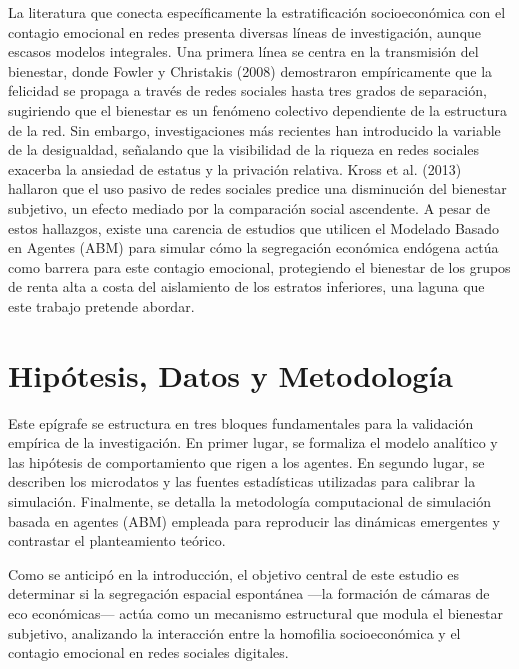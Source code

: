 \documentclass[a4paper,12pt]{article}
\begin{document}
La literatura que conecta específicamente la estratificación socioeconómica con el contagio emocional en redes presenta diversas líneas de investigación, aunque escasos modelos integrales.
Una primera línea se centra en la transmisión del bienestar, donde Fowler y Christakis (2008) demostraron empíricamente que la felicidad se propaga a través de redes sociales hasta tres grados de separación, sugiriendo que el bienestar es un fenómeno colectivo dependiente de la estructura de la red.
Sin embargo, investigaciones más recientes han introducido la variable de la desigualdad, señalando que la visibilidad de la riqueza en redes sociales exacerba la ansiedad de estatus y la privación relativa. Kross et al. (2013) hallaron que el uso pasivo de redes sociales predice una disminución del bienestar subjetivo, un efecto mediado por la comparación social ascendente.
A pesar de estos hallazgos, existe una carencia de estudios que utilicen el Modelado Basado en Agentes (ABM) para simular cómo la segregación económica endógena actúa como barrera para este contagio emocional, protegiendo el bienestar de los grupos de renta alta a costa del aislamiento de los estratos inferiores, una laguna que este trabajo pretende abordar.

\newpage

\section{Hipótesis, Datos y Metodología}

Este epígrafe se estructura en tres bloques fundamentales para la validación empírica de la investigación. En primer lugar, se formaliza el modelo analítico y las hipótesis de comportamiento que rigen a los agentes. En segundo lugar, se describen los microdatos y las fuentes estadísticas utilizadas para calibrar la simulación. Finalmente, se detalla la metodología computacional de simulación basada en agentes (ABM) empleada para reproducir las dinámicas emergentes y contrastar el planteamiento teórico.

Como se anticipó en la introducción, el objetivo central de este estudio es determinar si la segregación espacial espontánea —la formación de cámaras de eco económicas— actúa como un mecanismo estructural que modula el bienestar subjetivo, analizando la interacción entre la homofilia socioeconómica y el contagio emocional en redes sociales digitales.
\end{document}
